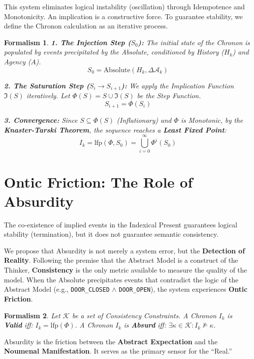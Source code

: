 \documentclass[12pt, a4paper]{article}
\newtheorem{formalism}{Formalism}
\begin{document}
This system eliminates logical instability (oscillation) through Idempotence and Monotonicity. An implication is a constructive force. To guarantee stability, we define the Chronon calculation as an iterative process.

\begin{formalism}
\textbf{1. The Injection Step ($S_0$):}
The initial state of the Chronon is populated by events precipitated by the Absolute, conditioned by History ($H_k$) and Agency ($A$).
$$S_0 = \text{Absolute}(H_k, \Delta \mathcal{A}_k)$$

\textbf{2. The Saturation Step ($S_{i} \to S_{i+1}$):}
We apply the Implication Function $\mathfrak{I}(S)$ iteratively.
Let $\Phi(S) = S \cup \mathfrak{I}(S)$ be the Step Function.
$$S_{i+1} = \Phi(S_i)$$

\textbf{3. Convergence:}
Since $S \subseteq \Phi(S)$ (Inflationary) and $\Phi$ is Monotonic, by the \textbf{Knaster-Tarski Theorem}, the sequence reaches a \textbf{Least Fixed Point}:
$$I_k = \text{lfp}(\Phi, S_0) = \bigcup_{i=0}^{\infty} \Phi^i(S_0)$$
\end{formalism}

\section{Ontic Friction: The Role of Absurdity}

The co-existence of implied events in the Indexical Present guarantees logical stability (termination), but it does not guarantee semantic consistency.

We propose that Absurdity is not merely a system error, but the \textbf{Detection of Reality}. Following the premise that the Abstract Model is a construct of the Thinker, \textbf{Consistency} is the only metric available to measure the quality of the model. When the Absolute precipitates events that contradict the logic of the Abstract Model (e.g., \texttt{DOOR\_CLOSED} $\land$ \texttt{DOOR\_OPEN}), the system experiences \textbf{Ontic Friction}.

\begin{formalism}
Let $\mathcal{K}$ be a set of Consistency Constraints.
A Chronon $I_k$ is \textbf{Valid} iff: $I_k = \text{lfp}(\Phi)$.
A Chronon $I_k$ is \textbf{Absurd} iff: $\exists \kappa \in \mathcal{K} : I_k \not\models \kappa$.
\end{formalism}

Absurdity is the friction between the \textbf{Abstract Expectation} and the \textbf{Noumenal Manifestation}. It serves as the primary sensor for the ``Real.''
\end{document}
